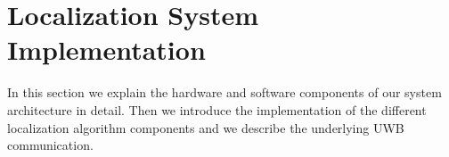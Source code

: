 
\chapter{Localization System Implementation} %

\label{Chapter4} %
In this section we explain the hardware and software components of our system architecture in detail. Then we introduce the implementation of the different localization algorithm components and we describe the underlying UWB communication.


